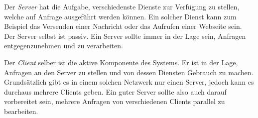 \documentclass[a4paper,11pt]{report}
\begin{document}
		Der \emph{Server} hat die Aufgabe, verschiedenste Dienste zur Verfügung zu stellen, welche auf Anfrage ausgeführt werden können. Ein solcher Dienst kann zum Beispiel das Versenden einer Nachricht oder das Aufrufen einer Webseite sein. Der Server selbst ist passiv. Ein Server sollte immer in der Lage sein, Anfragen entgegenzunehmen und zu verarbeiten.

		Der \emph{Client} selber ist die aktive Komponente des Systems. Er ist in der Lage, Anfragen an den Server zu stellen und von dessen Diensten Gebrauch zu machen.
		Grundsätzlich gibt es in einem solchen Netzwerk nur einen Server, jedoch kann es durchaus mehrere Clients geben. Ein guter Server sollte also auch darauf vorbereitet sein, mehrere Anfragen von verschiedenen Clients parallel zu bearbeiten. \cite{fachadmin.de:ServerClient}
		
		
\end{document}
